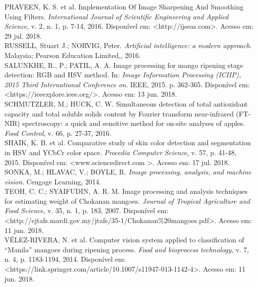 \noindent PRAVEEN, K. S. et al. Implementation Of Image Sharpening And Smoothing Using Filters. \textit{International Journal of Scientific Engineering and Applied Science}, v. 2, n. 1, p. 7-14, 2016. Disponível em: <http://ijseas.com>. Acesso em: 29 jul. 2018.
\\

\noindent RUSSELL, Stuart J.; NORVIG, Peter. \textit{Artificial intelligence: a modern approach}. Malaysia; Pearson Education Limited,, 2016.
\\

\noindent SALUNKHE, R., P.; PATIL, A. A. Image processing for mango ripening stage detection: RGB and HSV method. In: \textit{Image Information Processing (ICIIP), 2015 Third International Conference on}. IEEE, 2015. p. 362-365. Disponível em: <https://ieeexplore.ieee.org/>. Acesso em: 13 jun. 2018.
\\

\noindent SCHMUTZLER, M.; HUCK, C. W. Simultaneous detection of total antioxidant capacity and total soluble solids content by Fourier transform near-infrared (FT-NIR) spectroscopy: a quick and sensitive method for on-site analyses of apples. \textit{Food Control}, v. 66, p. 27-37, 2016.
\\

\noindent SHAIK, K. B. et al. Comparative study of skin color detection and segmentation in HSV and YCbCr color space. \textit{Procedia Computer Science}, v. 57, p. 41-48, 2015. Disponível em: <www.sciencedirect.com >. Acesso em: 17 jul. 2018.
\\

\noindent SONKA, M.; HLAVAC, V.; BOYLE, R. \textit{Image processing, analysis, and machine vision}. Cengage Learning, 2014.
\\

\noindent TEOH, C. C.; SYAIFUDIN, A. R. M. Image processing and analysis techniques for estimating weight of Chokanan mangoes. \textit{Journal of Tropical Agriculture and Food Science}, v. 35, n. 1, p. 183, 2007. Disponível em: <http://ejtafs.mardi.gov.my/jtafs/35-1/Chokanan\%20mangoes.pdf>. Acesso em: 11 jun. 2018.
\\

\noindent VÉLEZ-RIVERA, N. et al. Computer vision system applied to classification of “Manila” mangoes during ripening process. \textit{Food and bioprocess technology}, v. 7, n. 4, p. 1183-1194, 2014. Disponível em: <https://link.springer.com/article/10.1007/s11947-013-1142-4>. Acesso em: 11 jun. 2018.
\\

